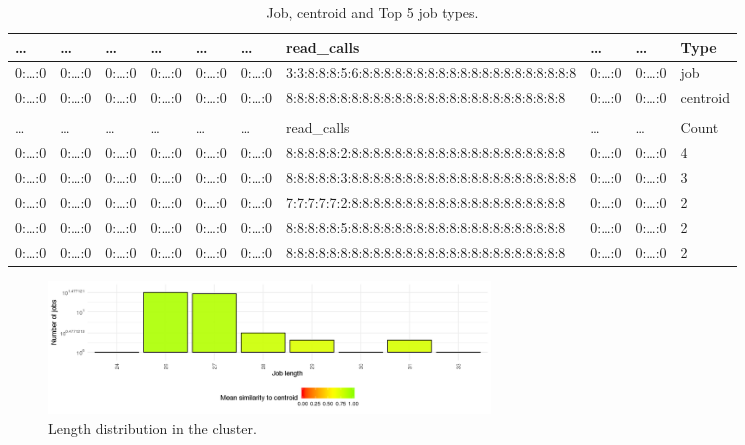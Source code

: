 \documentclass[]{llncs}
\begin{document}
\begin{table}
  \centering
  \begin{tiny}
    \begin{tabular}{@{ }l@{ }@{ }l@{ }@{ }l@{ }@{ }l@{ }@{ }l@{ }@{ }l@{ }@{ }l@{ }@{ }l@{ }@{ }l@{ }@{ }l@{ }}
      \dots & \dots & \dots & \dots & \dots & \dots & read\_calls & \dots & \dots & Type \\
      \hline
      0:…:0     & 0:…:0 & 0:…:0 & 0:…:0 & 0:…:0 & 0:…:0 & 3:3:8:8:8:5:6:8:8:8:8:8:8:8:8:8:8:8:8:8:8:8:8:8:8:8:8 & 0:…:0 & 0:…:0 & job      \\ 
      0:…:0     & 0:…:0 & 0:…:0 & 0:…:0 & 0:…:0 & 0:…:0 & 8:8:8:8:8:8:8:8:8:8:8:8:8:8:8:8:8:8:8:8:8:8:8:8:8:8   & 0:…:0 & 0:…:0 & centroid \\ 
                &       &       &       &       &       &                                                       &       &       &          \\ 
      \dots     & \dots & \dots & \dots & \dots & \dots & read\_calls                                           & \dots & \dots & Count    \\ 
      \hline
      0:\dots:0 & 0:…:0 & 0:…:0 & 0:…:0 & 0:…:0 & 0:…:0 & 8:8:8:8:8:2:8:8:8:8:8:8:8:8:8:8:8:8:8:8:8:8:8:8:8:8   & 0:…:0 & 0:…:0 & 4        \\ 
      0:…:0     & 0:…:0 & 0:…:0 & 0:…:0 & 0:…:0 & 0:…:0 & 8:8:8:8:8:3:8:8:8:8:8:8:8:8:8:8:8:8:8:8:8:8:8:8:8:8:8 & 0:…:0 & 0:…:0 & 3        \\ 
      0:…:0     & 0:…:0 & 0:…:0 & 0:…:0 & 0:…:0 & 0:…:0 & 7:7:7:7:7:2:8:8:8:8:8:8:8:8:8:8:8:8:8:8:8:8:8:8:8:8   & 0:…:0 & 0:…:0 & 2        \\ 
      0:…:0     & 0:…:0 & 0:…:0 & 0:…:0 & 0:…:0 & 0:…:0 & 8:8:8:8:8:5:8:8:8:8:8:8:8:8:8:8:8:8:8:8:8:8:8:8:8:8   & 0:…:0 & 0:…:0 & 2        \\ 
      0:…:0     & 0:…:0 & 0:…:0 & 0:…:0 & 0:…:0 & 0:…:0 & 8:8:8:8:8:8:8:8:8:8:8:8:8:8:8:8:8:8:8:8:8:8:8:8:8:8   & 0:…:0 & 0:…:0 & 2        \\ 
    \end{tabular}
  \end{tiny}
  \caption{Job, centroid and Top 5 job types.}
  \label{tab:use_case:pm_quant:top_jobs}
\end{table}

\begin{figure}
  \centering
  \includegraphics[width=4.61in,height=1.39in]{./media/image7.png}
  \caption{Length distribution in the cluster.}
  \label{fig:use_case:pm_quant:length}
\end{figure}
\end{document}
